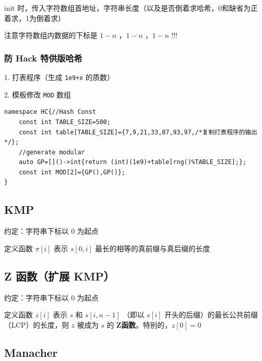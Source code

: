 \documentclass[12pt]{article}
\theoremstyle{definition}
\theoremstyle{remark}
\begin{document}
init 时，传入字符数组首地址，字符串长度（以及是否倒着求哈希，0和缺省为正着求，1为倒着求）

注意字符数组内数据的下标是 $1-n$ ，$1-n$ ，$1-n$ !!!



\subsubsection{防 Hack 特供版哈希}

1. 打表程序（生成 \texttt{1e9+x} 的质数）



\newpage

2. 模板修改 \texttt{MOD} 数组

\begin{lstlisting}[style=C++]
namespace HC{//Hash Const
	const int TABLE_SIZE=500;
	const int table[TABLE_SIZE]={7,9,21,33,87,93,97,/*复制打表程序的输出*/};
	//generate modular
	auto GP=[]()->int{return (int)(1e9)+table[rng()%TABLE_SIZE];};
	const int MOD[2]={GP(),GP()};
}
\end{lstlisting}

\subsection{KMP}

约定：字符串下标以 $0$ 为起点

定义函数 $\pi[i]$ 表示 $s[0,i]$ 最长的相等的真前缀与真后缀的长度



\newpage

\subsection{Z 函数（扩展 KMP）}

约定：字符串下标以 $0$ 为起点

定义函数 $z[i]$ 表示 $s$ 和 $s[i,n-1]$ （即以 $s[i]$ 开头的后缀）的最长公共前缀（LCP）的长度，则 $z$ 被成为 $s$ 的 \textbf{Z函数}。特别的，$z[0]=0$



\subsection{Manacher}
\end{document}

